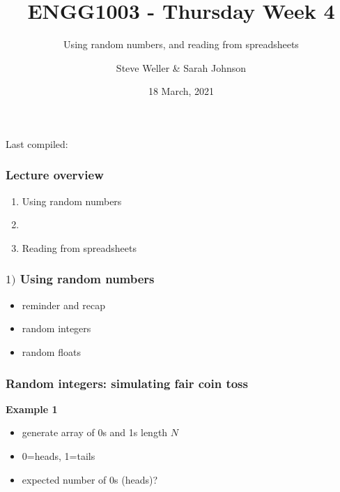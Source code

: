 \documentclass[english,14pt]{beamer}
\title{ENGG1003 - Thursday Week 4}
\subtitle{Using random numbers, and reading from spreadsheets}
\author{Steve Weller \& Sarah Johnson}
\institute{University of Newcastle}
\date{18 March, 2021}
\begin{document}
\begin{flushleft}
{\scriptsize Last compiled:~\DTMnow}
\vspace*{-5mm}
\end{flushleft}
\framebreak


\begin{frame}[fragile]

\frametitle{Lecture overview}
\begin{enumerate}
	\item Using random numbers

	\item[]
	
	\item Reading from spreadsheets

\end{enumerate}

\end{frame}


\begin{frame}[fragile]

\frametitle{$1)$ Using random numbers}

\begin{itemize}
	\item reminder and recap
	\item random integers
	\item random floats
\end{itemize}

\end{frame}


\begin{frame}[fragile]

\frametitle{Random integers: simulating fair coin toss}

\textbf{Example 1}\\
\vspace*{5mm}
\begin{itemize}
	\item generate array of 0s and 1s length $N$
	\item 0=heads, 1=tails
	\item expected number of 0s (heads)?
\end{itemize}

\end{frame}
\end{document}
